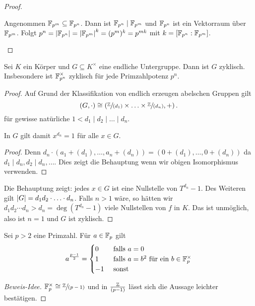 \begin{proof}
\begin{enumerate}[1)]
			Angenommen $\mathbb{F}_{p^{m}} \subseteq \mathbb{F}_{p^{n}}$. Dann ist $\mathbb{F}_{p^{n}} \mid \mathbb{F}_{p^{m}}$ und $\mathbb{F}_{p^{n}}$ ist ein Vektorraum über $\mathbb{F}_{p^{m}}$.
			Folgt $p^{n} = \abs{\mathbb{F}_{p^{n}}} = \abs{\mathbb{F}_{p^{m}}}^{k} = (p^{m})^{k} = p^{ m k}$ mit $k = [\mathbb{F}_{p^{n}} : \mathbb{F}_{p^{m}}]$.

	\end{enumerate}
\end{proof}

\begin{theorem}
	Sei $K$ ein Körper und $G \subseteq K^{\times}$ eine endliche Untergruppe.
	Dann ist $G$ zyklisch. Insbesondere ist $\mathbb{F}_{p^{n}}^{\times}$ zyklisch für jede Primzahlpotenz $p^{n}$.
\end{theorem}

\begin{proof}
	Auf Grund der Klassifikation von endlich erzeugen abelschen Gruppen gilt
	\[
		(G,\cdot) \cong \left(\sfrac{\mathbb{Z}}{(d_1)} \times  \ldots \times  \sfrac{\mathbb{Z}}{(d_{n})}, + \right)
	.\] 
	für gewisse natürliche $1 < d_1 \mid d_2 \mid \ldots \mid d_{n}$.
	\begin{claim}
		In $G$ gilt damit $x^{d_{n}} = 1$ für alle $x \in G$.
	\end{claim}
	\begin{proof}
		Denn $d_{n} \cdot (a_1 + (d_1), \ldots, a_{n} + (d_{n})) = (0 + (d_1),\ldots, 0 + (d_{n}))$ da $d_1 \mid d_{n}, d_2 \mid d_{n}, \ldots$.
		Dies zeigt die Behauptung wenn wir obigen Isomorphismus verwenden.
	\end{proof}
	Die Behauptung zeigt: jedes $x \in G$ ist eine Nullstelle von $T^{d_{n}} - 1$.
	Des Weiteren gilt $\abs{G} = d_1 d_2 \cdot \ldots \cdot d_{n}$.
	Falls $n > 1$ wäre, so hätten wir $d_1 d_2 \cdots d_{n} > d_{n} = \deg(T^{d_{n}} - 1)$ viele Nullstellen von $f$ in $K$.
	Das ist unmöglich, also ist $n = 1$ und $G$ ist zyklisch.
\end{proof}

\begin{corollary}
	Sei $p > 2$ eine Primzahl. Für $a \in \mathbb{F}_{p}$ gilt 
	\[
		a^{\frac{p-1}{2}} = \begin{cases}
			0 &\text{ falls } a = 0\\
			1 &\text{ falls } a = b^{2} \text{ für ein } b \in \mathbb{F}_{p}^{\times}\\
			-1 &\text{ sonst }
		\end{cases}
	\]
\end{corollary}

\begin{proof}[Beweis-Idee]
	$\mathbb{F}_{p}^{\times} \cong \sfrac{\mathbb{Z}}{(p-1)}$ und in $\frac{\mathbb{Z}}{(p-1)}$ lässt sich die Aussage leichter bestätigen.
\end{proof}


































 
